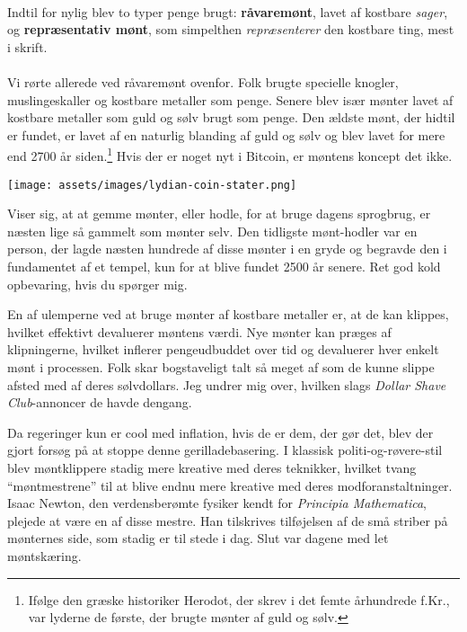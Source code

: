 \paragraph{}
Indtil for nylig blev to typer penge brugt: \textbf{råvaremønt}, lavet
af kostbare \textit{sager}, og \textbf{repræsentativ mønt}, som simpelthen
\textit{repræsenterer} den kostbare ting, mest i skrift.

\paragraph{}
Vi rørte allerede ved råvaremønt ovenfor. Folk brugte specielle knogler,
muslingeskaller og kostbare metaller som penge. Senere blev især mønter lavet af
kostbare metaller som guld og sølv brugt som penge. Den ældste mønt, der hidtil 
er fundet, er lavet af en naturlig blanding af guld og sølv og blev lavet for 
mere end 2700 år siden.\footnote{Ifølge den græske historiker Herodot, der 
skrev i det femte århundrede f.Kr., var lyderne de første, der brugte mønter
af guld og sølv.\cite{coinage-origins}} Hvis der er noget nyt i Bitcoin, er
 møntens koncept det ikke.

\newpage

\begin{center}
  \centering
  \texttt{[image: assets/images/lydian-coin-stater.png]}
  \label{fig:lydian-coin-stater}
\end{center}

Viser sig, at at gemme mønter, eller hodle, for at bruge dagens sprogbrug, er 
næsten lige så gammelt som mønter selv. Den tidligste mønt-hodler var en 
person, der lagde næsten hundrede af disse mønter i en gryde og begravde den 
i fundamentet af et tempel, kun for at blive fundet 2500 år senere. Ret god 
kold opbevaring, hvis du spørger mig.

En af ulemperne ved at bruge mønter af kostbare metaller er, at de kan 
klippes, hvilket effektivt devaluerer møntens værdi. Nye mønter kan præges 
af klipningerne, hvilket inflerer pengeudbuddet over tid og devaluerer hver 
enkelt mønt i processen. Folk skar bogstaveligt talt så meget af som de 
kunne slippe afsted med af deres sølvdollars. Jeg undrer mig over, hvilken 
slags \textit{Dollar Shave Club}-annoncer de havde dengang.

Da regeringer kun er cool med inflation, hvis de er dem, der gør det, blev 
der gjort forsøg på at stoppe denne gerilladebasering. I klassisk 
politi-og-røvere-stil blev møntklippere stadig mere kreative med deres 
teknikker, hvilket tvang \enquote{møntmestrene} til at blive endnu mere 
kreative med deres modforanstaltninger. Isaac Newton, den verdensberømte 
fysiker kendt for \textit{Principia Mathematica}, plejede at være en af 
disse mestre. Han tilskrives tilføjelsen af de små striber på mønternes 
side, som stadig er til stede i dag. Slut var dagene med let møntskæring.

